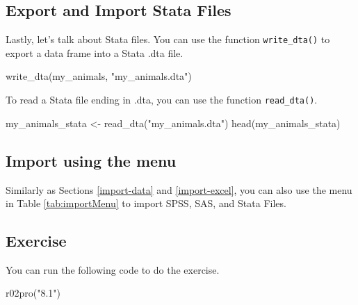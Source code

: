 \documentclass[
]{book}
\newenvironment{Shaded}{\begin{snugshade}}{\end{snugshade}}
\newcommand{\FunctionTok}[1]{\textcolor[rgb]{0.00,0.00,0.00}{#1}}
\newcommand{\NormalTok}[1]{#1}
\newcommand{\OtherTok}[1]{\textcolor[rgb]{0.56,0.35,0.01}{#1}}
\newcommand{\StringTok}[1]{\textcolor[rgb]{0.31,0.60,0.02}{#1}}
\begin{document}
\hypertarget{export-and-import-stata-files}{%
\subsection{Export and Import Stata Files}\label{export-and-import-stata-files}}

Lastly, let's talk about Stata files. You can use the function \texttt{write\_dta()} to export a data frame into a Stata .dta file.

\begin{Shaded}
\begin{Highlighting}[]
\FunctionTok{write\_dta}\NormalTok{(my\_animals, }\StringTok{"my\_animals.dta"}\NormalTok{)}
\end{Highlighting}
\end{Shaded}

To read a Stata file ending in .dta, you can use the function \texttt{read\_dta()}.

\begin{Shaded}
\begin{Highlighting}[]
\NormalTok{my\_animals\_stata }\OtherTok{\textless{}{-}} \FunctionTok{read\_dta}\NormalTok{(}\StringTok{"my\_animals.dta"}\NormalTok{)}
\FunctionTok{head}\NormalTok{(my\_animals\_stata)}
\end{Highlighting}
\end{Shaded}

\hypertarget{import-using-the-menu}{%
\subsection{Import using the menu}\label{import-using-the-menu}}

Similarly as Sections \ref{import-data} and \ref{import-excel}, you can also use the menu in Table \ref{tab:importMenu} to import SPSS, SAS, and Stata Files.

\hypertarget{exercise-1}{%
\subsection{Exercise}\label{exercise-1}}

You can run the following code to do the exercise.

\begin{Shaded}
\begin{Highlighting}[]
\FunctionTok{r02pro}\NormalTok{(}\StringTok{"8.1"}\NormalTok{)}
\end{Highlighting}
\end{Shaded}
\end{document}
